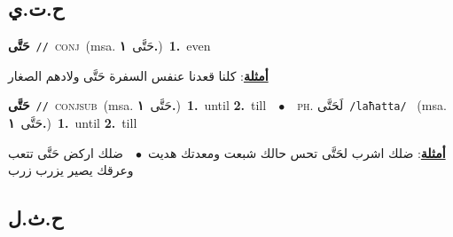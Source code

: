 \documentclass[10pt,a4paper,twoside]{article} %
\begin{document}
\begin{multicols}{2}
{{{{{{{{{\vspace{-3mm}
\subsection*{\color{blue}\foreignlanguage{arabic}{ح.ت.ي}\color{blue}{}} 

{\setlength\topsep{0pt}\textbf{\foreignlanguage{arabic}{حَتَّى}}\ {\color{gray}\texttt{//}\color{black}}\ \textsc{conj}\ \color{gray}(msa. \foreignlanguage{arabic}{حَتَّى}~\foreignlanguage{arabic}{\textbf{١.}})\color{black}\ \textbf{1.}~even\  \begin{flushright}\color{gray}\foreignlanguage{arabic}{\textbf{\underline{\foreignlanguage{arabic}{أمثلة}}}: كلنا قعدنا عنفس السفرة حَتَّى ولادهم الصغار}\end{flushright}\color{black}} \vspace{2mm}

{\setlength\topsep{0pt}\textbf{\foreignlanguage{arabic}{حَتَّى}}\ {\color{gray}\texttt{//}\color{black}}\ \textsc{conj\textunderscore sub}\ \color{gray}(msa. \foreignlanguage{arabic}{حَتَّى}~\foreignlanguage{arabic}{\textbf{١.}})\color{black}\ \textbf{1.}~until  \textbf{2.}~till\ \ $\bullet$\ \ \textsc{ph.} \color{gray} \foreignlanguage{arabic}{لَحَتَّى}\color{black}\ {\color{gray}\texttt{/{\sffamily laħatta}/}\color{black}}\ \color{gray} (msa. \foreignlanguage{arabic}{حَتَّى}~\foreignlanguage{arabic}{\textbf{١.}})\color{black}\ \textbf{1.}~until  \textbf{2.}~till\  \begin{flushright}\color{gray}\foreignlanguage{arabic}{\textbf{\underline{\foreignlanguage{arabic}{أمثلة}}}: ضلك اشرب لحَتَّى تحس حالك شبعت ومعدتك هديت\ $\bullet$\ \  ضلك اركض حَتَّى تتعب وعرقك يصير يزرب زرب}\end{flushright}\color{black}} \vspace{2mm}

\vspace{-3mm}
\subsection*{\color{blue}\foreignlanguage{arabic}{ح.ث.ل}\color{blue}{}} 

}}}}}}}}}
\end{multicols}
\end{document}
